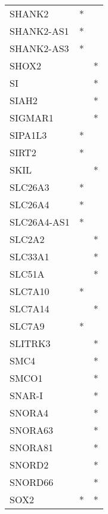 \begin{longtable}{lcc}
SHANK2           &              * &            \\
SHANK2-AS1       &              * &            \\
SHANK2-AS3       &              * &            \\
SHOX2            &                &          * \\
SI               &                &          * \\
SIAH2            &                &          * \\
SIGMAR1          &                &          * \\
SIPA1L3          &              * &            \\
SIRT2            &              * &            \\
SKIL             &                &          * \\
SLC26A3          &              * &            \\
SLC26A4          &              * &            \\
SLC26A4-AS1      &              * &            \\
SLC2A2           &                &          * \\
SLC33A1          &                &          * \\
SLC51A           &                &          * \\
SLC7A10          &              * &            \\
SLC7A14          &                &          * \\
SLC7A9           &              * &            \\
SLITRK3          &                &          * \\
SMC4             &                &          * \\
SMCO1            &                &          * \\
SNAR-I           &                &          * \\
SNORA4           &                &          * \\
SNORA63          &                &          * \\
SNORA81          &                &          * \\
SNORD2           &                &          * \\
SNORD66          &                &          * \\
SOX2             &              * &          * \\

\end{longtable}

